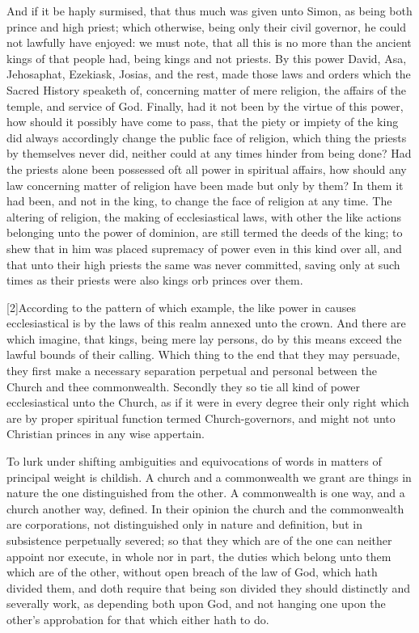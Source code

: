 And if it be haply surmised, that thus much was given unto Simon, as being both prince and high priest; which otherwise, being only their civil governor, he could not lawfully have enjoyed: we must note, that all this is no more than the ancient kings of that people had, being kings and not priests. By this power David, Asa, Jehosaphat, Ezekiask, Josias, and the rest, made those laws and orders which the Sacred History speaketh of, concerning matter of mere religion, the affairs of the temple, and service of God. Finally, had it not been by the virtue of this power, how should it possibly have come to pass, that the piety or impiety of the king did always accordingly change the public face of religion, which thing the priests by themselves never did, neither could at any times hinder from being done? Had the priests alone been possessed oft all power in spiritual affairs, how should any law concerning matter of religion have been made but only by them? In them it had been, and  not in the king, to change the face of religion at any time. The altering of religion, the making of ecclesiastical laws, with other the like actions belonging unto the power of dominion, are still termed the deeds of the king; to shew that in him was placed supremacy of power even in this kind over all, and that unto their high priests the same was never committed, saving only at such times as their priests were also kings orb princes over them.

[2]According to the pattern of which example, the like power in causes ecclesiastical is by the laws of this realm annexed unto the crown. And there are which imagine, that kings, being mere lay persons, do by this means exceed the lawful bounds of their calling. Which thing to the end that they may persuade, they first make a necessary separation perpetual and personal between the Church and thee commonwealth. Secondly they so tie all kind of power ecclesiastical unto the Church, as if it were in every degree their only right which are by proper spiritual function termed Church-governors, and might not unto Christian princes in any wise appertain.

To lurk under shifting ambiguities and equivocations of words in matters of principal weight is childish. A church and a commonwealth we grant are things in nature the one distinguished from the other. A commonwealth is one way, and a church another way, defined. In their opinion the church and the commonwealth are corporations, not distinguished  only in nature and definition, but in subsistence perpetually severed; so that they which are of the one can neither appoint nor execute, in whole nor in part, the duties which belong unto them which are of the other, without open breach of the law of God, which hath divided them, and doth require that being son divided they should distinctly and severally work, as depending both upon God, and not hanging one upon the other’s approbation for that which either hath to do.

